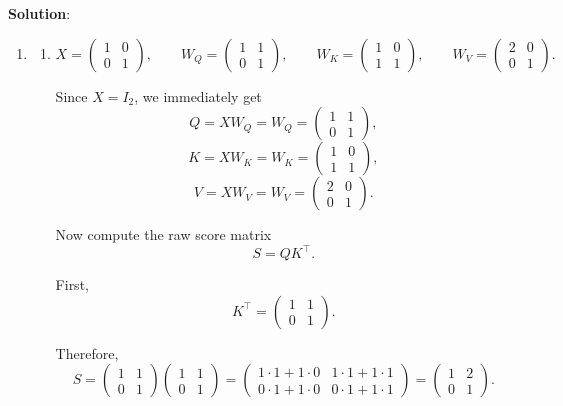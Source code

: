 \documentclass[submit]{harvardml}
\newenvironment{solution}{
    \vspace{2mm}
    \color{blue}\noindent\textbf{Solution}:
}{}
\begin{document}
\newpage


\begin{solution}
	\begin{enumerate}
	    \item \begin{enumerate}
	        \item \[
X=\begin{pmatrix}
1 & 0\\
0 & 1
\end{pmatrix},
\qquad
W_Q=\begin{pmatrix}
1 & 1\\
0 & 1
\end{pmatrix},
\qquad
W_K=\begin{pmatrix}
1 & 0\\
1 & 1
\end{pmatrix},
\qquad
W_V=\begin{pmatrix}
2 & 0\\
0 & 1
\end{pmatrix}.
\]

Since \(X = I_2\), we immediately get
\[
Q = XW_Q = W_Q = \begin{pmatrix}
1 & 1\\
0 & 1
\end{pmatrix},
\]
\[
K = XW_K = W_K = \begin{pmatrix}
1 & 0\\
1 & 1
\end{pmatrix},
\]
\[
V = XW_V = W_V = \begin{pmatrix}
2 & 0\\
0 & 1
\end{pmatrix}.
\]

Now compute the raw score matrix
\[
S = QK^\top.
\]

First,
\[
K^\top = \begin{pmatrix}
1 & 1\\
0 & 1
\end{pmatrix}.
\]

Therefore,
\[
S
=
\begin{pmatrix}
1 & 1\\
0 & 1
\end{pmatrix}
\begin{pmatrix}
1 & 1\\
0 & 1
\end{pmatrix}
=
\begin{pmatrix}
1\cdot 1 + 1\cdot 0 & 1\cdot 1 + 1\cdot 1\\
0\cdot 1 + 1\cdot 0 & 0\cdot 1 + 1\cdot 1
\end{pmatrix}
=
\begin{pmatrix}
1 & 2\\
0 & 1
\end{pmatrix}.
\]


\end{enumerate}
\end{enumerate}
\end{solution}
\end{document}
